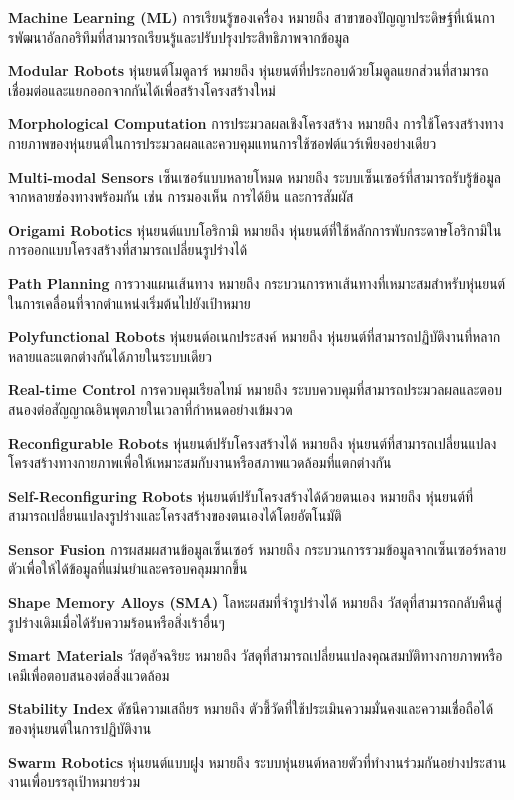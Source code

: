 \documentclass[a4paper]{article}
\begin{document}
\textbf{Machine Learning (ML)} การเรียนรู้ของเครื่อง หมายถึง สาขาของปัญญาประดิษฐ์ที่เน้นการพัฒนาอัลกอริทึมที่สามารถเรียนรู้และปรับปรุงประสิทธิภาพจากข้อมูล

\textbf{Modular Robots} หุ่นยนต์โมดูลาร์ หมายถึง หุ่นยนต์ที่ประกอบด้วยโมดูลแยกส่วนที่สามารถเชื่อมต่อและแยกออกจากกันได้เพื่อสร้างโครงสร้างใหม่

\textbf{Morphological Computation} การประมวลผลเชิงโครงสร้าง หมายถึง การใช้โครงสร้างทางกายภาพของหุ่นยนต์ในการประมวลผลและควบคุมแทนการใช้ซอฟต์แวร์เพียงอย่างเดียว

\textbf{Multi-modal Sensors} เซ็นเซอร์แบบหลายโหมด หมายถึง ระบบเซ็นเซอร์ที่สามารถรับรู้ข้อมูลจากหลายช่องทางพร้อมกัน เช่น การมองเห็น การได้ยิน และการสัมผัส

\textbf{Origami Robotics} หุ่นยนต์แบบโอริกามิ หมายถึง หุ่นยนต์ที่ใช้หลักการพับกระดาษโอริกามิในการออกแบบโครงสร้างที่สามารถเปลี่ยนรูปร่างได้

\textbf{Path Planning} การวางแผนเส้นทาง หมายถึง กระบวนการหาเส้นทางที่เหมาะสมสำหรับหุ่นยนต์ในการเคลื่อนที่จากตำแหน่งเริ่มต้นไปยังเป้าหมาย

\textbf{Polyfunctional Robots} หุ่นยนต์อเนกประสงค์ หมายถึง หุ่นยนต์ที่สามารถปฏิบัติงานที่หลากหลายและแตกต่างกันได้ภายในระบบเดียว

\textbf{Real-time Control} การควบคุมเรียลไทม์ หมายถึง ระบบควบคุมที่สามารถประมวลผลและตอบสนองต่อสัญญาณอินพุตภายในเวลาที่กำหนดอย่างเข้มงวด

\textbf{Reconfigurable Robots} หุ่นยนต์ปรับโครงสร้างได้ หมายถึง หุ่นยนต์ที่สามารถเปลี่ยนแปลงโครงสร้างทางกายภาพเพื่อให้เหมาะสมกับงานหรือสภาพแวดล้อมที่แตกต่างกัน

\textbf{Self-Reconfiguring Robots} หุ่นยนต์ปรับโครงสร้างได้ด้วยตนเอง หมายถึง หุ่นยนต์ที่สามารถเปลี่ยนแปลงรูปร่างและโครงสร้างของตนเองได้โดยอัตโนมัติ

\textbf{Sensor Fusion} การผสมผสานข้อมูลเซ็นเซอร์ หมายถึง กระบวนการรวมข้อมูลจากเซ็นเซอร์หลายตัวเพื่อให้ได้ข้อมูลที่แม่นยำและครอบคลุมมากขึ้น

\textbf{Shape Memory Alloys (SMA)} โลหะผสมที่จำรูปร่างได้ หมายถึง วัสดุที่สามารถกลับคืนสู่รูปร่างเดิมเมื่อได้รับความร้อนหรือสิ่งเร้าอื่นๆ

\textbf{Smart Materials} วัสดุอัจฉริยะ หมายถึง วัสดุที่สามารถเปลี่ยนแปลงคุณสมบัติทางกายภาพหรือเคมีเพื่อตอบสนองต่อสิ่งแวดล้อม

\textbf{Stability Index} ดัชนีความเสถียร หมายถึง ตัวชี้วัดที่ใช้ประเมินความมั่นคงและความเชื่อถือได้ของหุ่นยนต์ในการปฏิบัติงาน

\textbf{Swarm Robotics} หุ่นยนต์แบบฝูง หมายถึง ระบบหุ่นยนต์หลายตัวที่ทำงานร่วมกันอย่างประสานงานเพื่อบรรลุเป้าหมายร่วม
\end{document}
